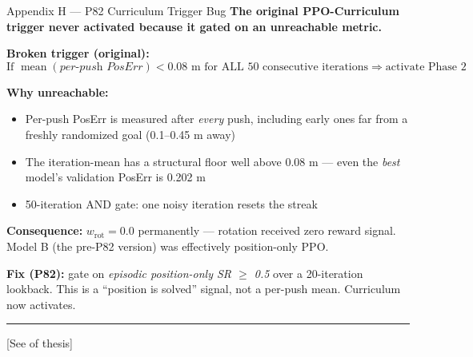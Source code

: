 \documentclass[aspectratio=169,xcolor=dvipsnames,t]{beamer}
\newcommand{\litfooter}[1]{%
  \vspace{2pt}%
  \hrule%
  \vspace{2pt}%
  {\tiny\color{LightDarkGrey} #1}%
}
\begin{document}
\begin{frame}[t]{Appendix H — P82 Curriculum Trigger Bug}
  \small
  \textbf{The original PPO-Curriculum trigger never activated because it gated on an unreachable metric.}

  \vspace{4pt}
  \textbf{Broken trigger (original):}
  \[
  \text{If } \operatorname{mean}(\textit{per-push PosErr}) < 0.08\text{ m for ALL 50 consecutive iterations}
  \Rightarrow \text{activate Phase 2}
  \]

  \textbf{Why unreachable:}
  \begin{itemize}
    \item Per-push PosErr is measured after \emph{every} push, including early ones far from a freshly randomized goal (0.1--0.45 m away)
    \item The iteration-mean has a structural floor well above 0.08 m — even the \emph{best} model's validation PosErr is 0.202 m
    \item 50-iteration AND gate: one noisy iteration resets the streak
  \end{itemize}

  \textbf{Consequence:} $w_{\text{rot}} = 0.0$ permanently — rotation received zero reward signal. Model B (the pre-P82 version) was effectively position-only PPO.

  \textbf{Fix (P82):} gate on \textit{episodic position-only SR $\ge$ 0.5} over a 20-iteration lookback. This is a ``position is solved'' signal, not a per-push mean. Curriculum now activates.

  \vfill\litfooter{[See  of thesis]}
\end{frame}
\end{document}
